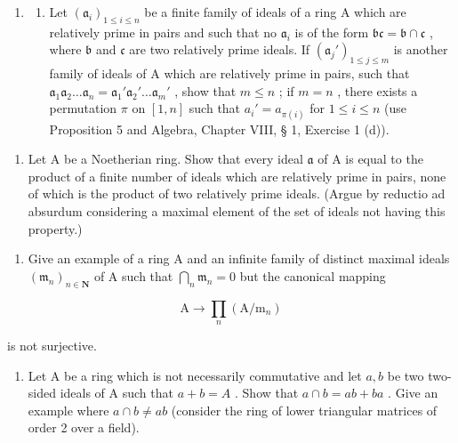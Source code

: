 \begin{enumerate}
\def\labelenumi{\arabic{enumi}.}
\setcounter{enumi}{8}
\tightlist
\item
  \begin{enumerate}
  \def\labelenumii{(\alph{enumii})}
  \tightlist
  \item
    Let \((\mathfrak{a}_i)_{1 \leqslant i \leqslant n}\) be a finite family of ideals of a ring A which are relatively prime in pairs and such that no \(\mathfrak{a}_i\) is of the form \(\mathfrak{bc} = \mathfrak{b} \cap \mathfrak{c}\) , where \(\mathfrak{b}\) and \(\mathfrak{c}\) are two relatively prime ideals. If \((\mathfrak{a}_j')_{1 \leqslant j \leqslant m}\) is another family of ideals of A which are relatively prime in pairs, such that \(\mathfrak{a}_1\mathfrak{a}_2 \ldots \mathfrak{a}_n = \mathfrak{a}_1'\mathfrak{a}_2' \ldots \mathfrak{a}_m'\) , show that \(m \leqslant n\) ; if \(m = n\) , there exists a permutation \(\pi\) on \([1, n]\) such that \(a_i' = a_{\pi(i)}\) for \(1 \leqslant i \leqslant n\) (use Proposition 5 and Algebra, Chapter VIII, § 1, Exercise 1 (d)).
  \end{enumerate}
\end{enumerate}

\begin{enumerate}
\def\labelenumi{(\alph{enumi})}
\setcounter{enumi}{1}
\tightlist
\item
  Let A be a Noetherian ring. Show that every ideal \(\mathfrak{a}\) of A is equal to the product of a finite number of ideals which are relatively prime in pairs, none of which is the product of two relatively prime ideals. (Argue by reductio ad absurdum considering a maximal element of the set of ideals not having this property.)
\end{enumerate}

\begin{enumerate}
\def\labelenumi{\arabic{enumi}.}
\setcounter{enumi}{9}
\tightlist
\item
  Give an example of a ring A and an infinite family of distinct maximal ideals \((\mathfrak{m}_n)_{n\in \mathbf{N}}\) of A such that \(\bigcap_{n}\mathfrak{m}_{n} = 0\) but the canonical mapping
\end{enumerate}

\[
\mathrm{A} \rightarrow \prod_ {n} (\mathrm{A} / \mathrm{m} _ {n})
\]

is not surjective.

\begin{enumerate}
\def\labelenumi{\arabic{enumi}.}
\setcounter{enumi}{10}
\tightlist
\item
  Let A be a ring which is not necessarily commutative and let \(a, b\) be two two-sided ideals of A such that \(a + b = A\) . Show that \(a \cap b = ab + ba\) . Give an example where \(a \cap b \neq ab\) (consider the ring of lower triangular matrices of order 2 over a field).
\end{enumerate}

